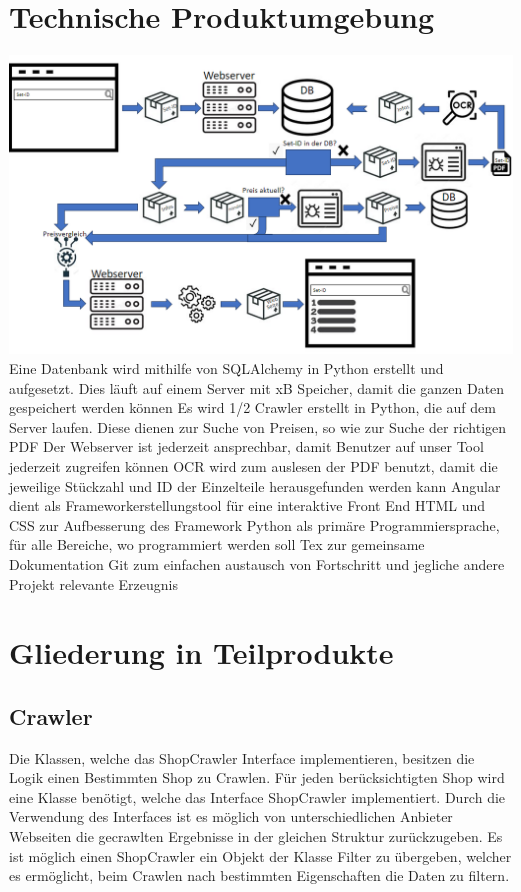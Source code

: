 \section{Technische Produktumgebung}
\includegraphics[width=18cm]{pictures/systemdurchlauf.png} \newline
Eine Datenbank wird mithilfe von SQLAlchemy in Python erstellt und aufgesetzt. Dies läuft auf einem Server mit xB Speicher, damit die ganzen Daten gespeichert werden können \newline
Es wird 1/2 Crawler erstellt in Python, die auf dem Server laufen. Diese dienen zur Suche von Preisen, so wie zur Suche der richtigen PDF \newline
Der Webserver ist jederzeit ansprechbar, damit Benutzer auf unser Tool jederzeit zugreifen können
OCR wird zum auslesen der PDF benutzt, damit die jeweilige Stückzahl und ID der Einzelteile herausgefunden werden kann \newline
Angular dient als Frameworkerstellungstool für eine interaktive Front End \newline
HTML und CSS zur Aufbesserung des Framework \newline
Python als primäre Programmiersprache, für alle Bereiche, wo programmiert werden soll \newline
Tex zur gemeinsame Dokumentation \newline
Git zum einfachen austausch von Fortschritt und jegliche andere Projekt relevante Erzeugnis \newline

\section{Gliederung in Teilprodukte}
\subsection{Crawler}
Die Klassen, welche das ShopCrawler Interface implementieren, besitzen die Logik einen Bestimmten Shop zu Crawlen. Für jeden berücksichtigten Shop wird eine Klasse benötigt, welche das Interface ShopCrawler implementiert.  Durch die Verwendung des Interfaces ist es möglich von unterschiedlichen Anbieter Webseiten die gecrawlten Ergebnisse in der gleichen Struktur zurückzugeben. Es ist möglich einen ShopCrawler ein Objekt der Klasse Filter zu übergeben, welcher es ermöglicht, beim Crawlen nach bestimmten Eigenschaften die Daten zu filtern.

